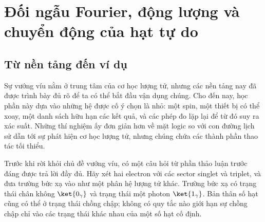 \chapter{Đối ngẫu Fourier, động lượng và chuyển động của hạt tự do}

\section{Từ nền tảng đến ví dụ}

Sự vướng víu nằm ở trung tâm của cơ học lượng tử, nhưng các nền tảng nay đã được trình bày đủ rõ để ta có thể bắt đầu vận dụng chúng. Cho đến nay, học phần này dựa vào những hệ được cố ý chọn là nhỏ: một spin, một thiết bị có thể xoay, một danh sách hữu hạn các kết quả, và các phép đo lặp lại để từ đó suy ra xác suất. Những thí nghiệm ấy đơn giản hơn về mặt logic so với con đường lịch sử dẫn tới sự phát hiện cơ học lượng tử, nhưng chúng chứa các thành phần thao tác tối thiểu.

\begin{classroomqa}
\end{classroomqa}

\begin{classroomqa}
\end{classroomqa}

Trước khi rời khỏi chủ đề vướng víu, có một câu hỏi từ phần thảo luận trước đáng được trả lời đầy đủ. Hãy xét hai electron với các sector singlet và triplet, và đưa trường bức xạ vào như một phân hệ lượng tử khác. Trường bức xạ có trạng thái chân không \(\ket{0_\gamma}\) và trạng thái một photon \(\ket{1_\gamma}\). Bản thân số hạt cũng có thể ở trạng thái chồng chập; không có quy tắc nào giới hạn sự chồng chập chỉ vào các trạng thái khác nhau của một số hạt cố định.

